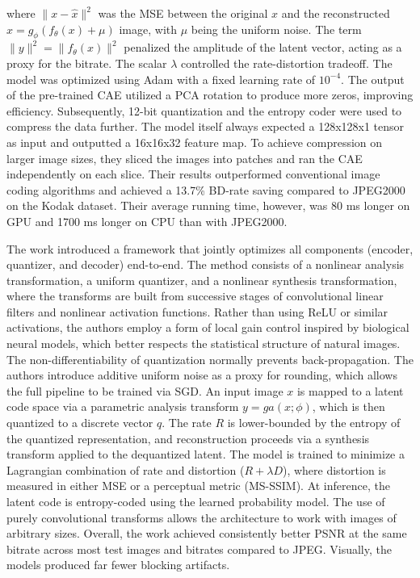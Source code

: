 \documentclass[conference]{IEEEtran}
\begin{document}
\noindent where $\|x - \hat{x}\|^2$ was the MSE between the original $x$ 
and the reconstructed $\hat{x} = g_\phi(f_\theta(x) + \mu)$ image, with $\mu$ being the 
uniform noise. 
The term $\|y\|^2 = \|f_\theta(x)\|^2$ penalized the amplitude of the latent vector, 
acting as a proxy for the bitrate. The scalar $\lambda$ controlled the rate-distortion 
tradeoff. The model was optimized using Adam with a fixed learning rate of $10^{-4}$. The output of the pre-trained CAE utilized a PCA rotation to produce more zeros, improving efficiency. Subsequently, 12-bit quantization and the entropy coder were used to compress the data further. The model itself always expected a 128x128x1 tensor as input and outputted a 16x16x32 feature map. To achieve compression on larger image sizes, they sliced the images into patches and ran the CAE independently on each slice. Their results outperformed conventional image coding algorithms and achieved a 13.7\% BD-rate saving compared to JPEG2000 on the Kodak dataset. Their average running time, however, was 80 ms longer on GPU and 1700 ms longer on CPU than with JPEG2000. 


The work \cite{balle_end--end_2017} introduced a framework that jointly optimizes all components (encoder, quantizer, and decoder) end-to-end. The method consists of a nonlinear analysis transformation, a uniform quantizer, and a nonlinear synthesis transformation, where the transforms are built from successive stages of convolutional linear filters and nonlinear activation functions. Rather than using ReLU or similar activations, the authors employ a form of local gain control inspired by biological neural models, which better respects the statistical structure of natural images. The non-differentiability of quantization normally prevents back-propagation. The authors introduce additive uniform noise as a proxy for rounding, which allows the full pipeline to be trained via SGD. An input image $x$ is mapped to a latent code space via a parametric analysis transform $y = ga(x; \phi)$, which is then quantized to a discrete vector $q$. The rate $R$ is lower-bounded by the entropy of the quantized representation, and reconstruction proceeds via a synthesis transform applied to the dequantized latent. The model is trained to minimize a Lagrangian combination of rate and distortion ($R + \lambda D$), where distortion is measured in either MSE or a perceptual metric (MS-SSIM). At inference, the latent code is entropy-coded using the learned probability model. The use of purely convolutional transforms allows the architecture to work with images of arbitrary sizes. Overall, the work achieved consistently better PSNR at the same bitrate across most test images and bitrates compared to JPEG. Visually, the models produced far fewer blocking artifacts.
\end{document}
